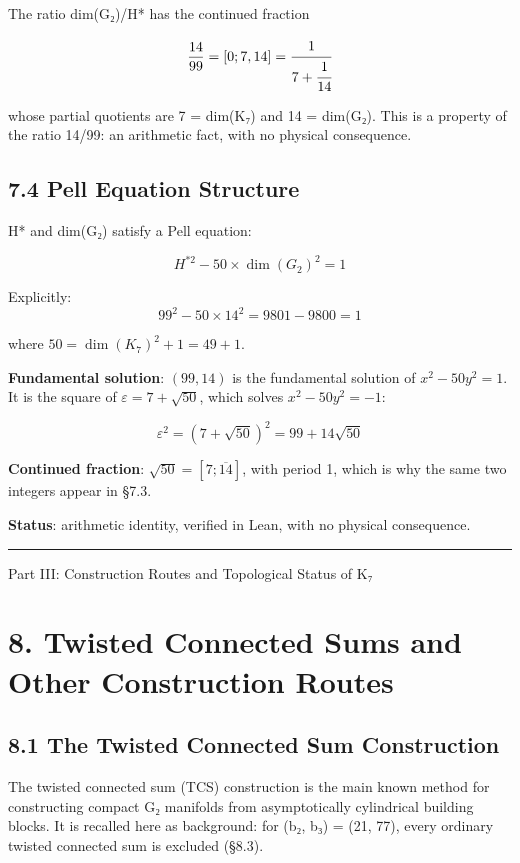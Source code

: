\documentclass[11pt,a4paper]{article}
\begin{document}
The ratio dim(G₂)/H* has the continued fraction

\[\frac{14}{99} = [0; 7, 14] = \cfrac{1}{7 + \cfrac{1}{14}}\]

whose partial quotients are 7 = dim(K₇) and 14 = dim(G₂). This is a property of the ratio 14/99: an arithmetic fact, with no physical consequence.

\subsection{7.4 Pell Equation Structure}\label{pell-equation-structure}

H* and dim(G₂) satisfy a Pell equation:

\[\boxed{H^{*2} - 50 \times \dim(G_2)^2 = 1}\]

Explicitly: \[99^2 - 50 \times 14^2 = 9801 - 9800 = 1\]

where \(50 = \dim(K_7)^2 + 1 = 49 + 1\).

\textbf{Fundamental solution}: \((99, 14)\) is the fundamental solution of \(x^2 - 50y^2 = 1\). It is the square of \(\varepsilon = 7 + \sqrt{50}\), which solves \(x^2 - 50y^2 = -1\):

\[\varepsilon^2 = (7 + \sqrt{50})^2 = 99 + 14\sqrt{50}\]

\textbf{Continued fraction}: \(\sqrt{50} = [7; \overline{14}]\), with period 1, which is why the same two integers appear in §7.3.

\textbf{Status}: arithmetic identity, verified in Lean, with no physical consequence.

\begin{center}\rule{\linewidth}{0.5pt}\end{center}

Part III: Construction Routes and Topological Status of K₇

\section{8. Twisted Connected Sums and Other Construction Routes}\label{twisted-connected-sums-and-other-construction-routes}

\subsection{8.1 The Twisted Connected Sum Construction}\label{the-twisted-connected-sum-construction}

The twisted connected sum (TCS) construction is the main known method for constructing compact G₂ manifolds from asymptotically cylindrical building blocks. It is recalled here as background: for (b₂, b₃) = (21, 77), every ordinary twisted connected sum is excluded (§8.3).
\end{document}
